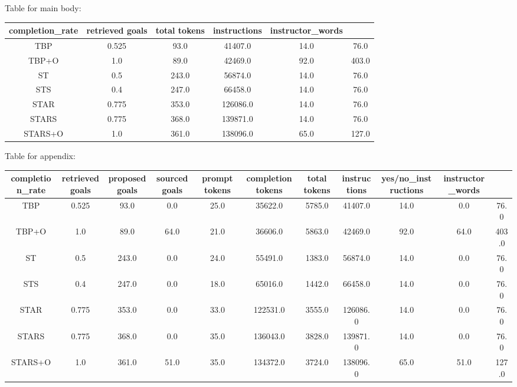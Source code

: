 Table for main body:
\begin{tabular}{c ccccc|}
\hline
completion_rate & retrieved goals & total tokens & instructions & instructor_words \\
\hline
TBP & 0.525 & 93.0 & 41407.0 & 14.0 & 76.0 \\
TBP+O & 1.0 & 89.0 & 42469.0 & 92.0 & 403.0 \\
ST & 0.5 & 243.0 & 56874.0 & 14.0 & 76.0 \\
STS & 0.4 & 247.0 & 66458.0 & 14.0 & 76.0 \\
STAR & 0.775 & 353.0 & 126086.0 & 14.0 & 76.0 \\
STARS & 0.775 & 368.0 & 139871.0 & 14.0 & 76.0 \\
STARS+O & 1.0 & 361.0 & 138096.0 & 65.0 & 127.0 \\
\hline
\end{tabular}

Table for appendix:
\begin{tabular}{c cccccccccc|}
\hline
completion_rate & retrieved goals & proposed goals & sourced goals & prompt tokens & completion tokens & total tokens & instructions & yes/no_instructions & instructor_words \\
\hline
TBP & 0.525 & 93.0 & 0.0 & 25.0 & 35622.0 & 5785.0 & 41407.0 & 14.0 & 0.0 & 76.0 \\
TBP+O & 1.0 & 89.0 & 64.0 & 21.0 & 36606.0 & 5863.0 & 42469.0 & 92.0 & 64.0 & 403.0 \\
ST & 0.5 & 243.0 & 0.0 & 24.0 & 55491.0 & 1383.0 & 56874.0 & 14.0 & 0.0 & 76.0 \\
STS & 0.4 & 247.0 & 0.0 & 18.0 & 65016.0 & 1442.0 & 66458.0 & 14.0 & 0.0 & 76.0 \\
STAR & 0.775 & 353.0 & 0.0 & 33.0 & 122531.0 & 3555.0 & 126086.0 & 14.0 & 0.0 & 76.0 \\
STARS & 0.775 & 368.0 & 0.0 & 35.0 & 136043.0 & 3828.0 & 139871.0 & 14.0 & 0.0 & 76.0 \\
STARS+O & 1.0 & 361.0 & 51.0 & 35.0 & 134372.0 & 3724.0 & 138096.0 & 65.0 & 51.0 & 127.0 \\
\hline
\end{tabular}
